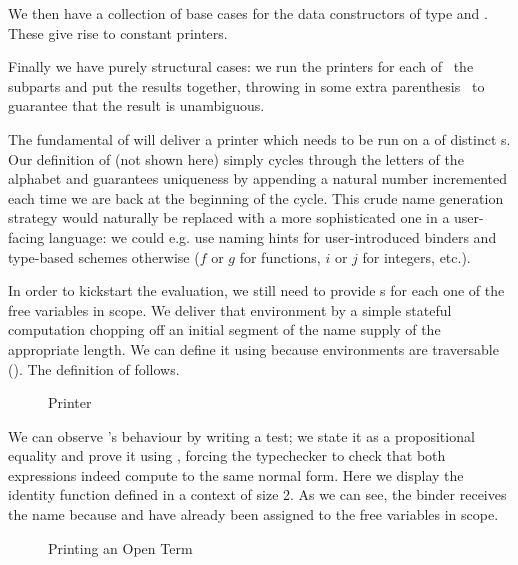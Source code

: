 
We then have a collection of base cases for the data constructors of type
 and . These give rise to constant printers.


Finally we have purely structural cases: we run the printers for each of~
the subparts and put the results together, throwing in some extra parenthesis~
to guarantee that the result is unambiguous.



The fundamental  of  will deliver a printer which needs to be run
on a  of distinct s. Our definition of  (not
shown here) simply cycles through the letters of the alphabet and guarantees
uniqueness by appending a natural number incremented each time we are back at
the beginning of the cycle. This crude name generation strategy would naturally
be replaced with a more sophisticated one in a user-facing language: we could
e.g. use naming hints for user-introduced binders and type-based schemes otherwise
($f$ or $g$ for functions, $i$ or $j$ for integers, etc.).

In order to kickstart the evaluation, we still need to provide s
for each one of the free variables in scope. We deliver that environment
by a simple stateful computation  chopping off an initial segment
of the name supply of the appropriate length. We can define it using 
because environments are traversable (\cite{mcbride_paterson_2008}).
The definition of  follows.

\begin{figure}[h]
\begin{minipage}{0.5\textwidth}
\end{minipage}\begin{minipage}{0.5\textwidth}
\end{minipage}

\caption{Printer\label{fig:printer}}
\end{figure}

We can observe 's behaviour by writing a test; we state it as a
propositional equality and prove it using , forcing the typechecker
to check that both expressions indeed compute to the same normal form. Here
we display the identity function defined in a context of size 2. As we can see,
the binder receives the name  because  and  have
already been assigned to the free variables in scope.

\begin{figure}[h]
\caption{Printing an Open Term\label{fig:printtest}}
\end{figure}
